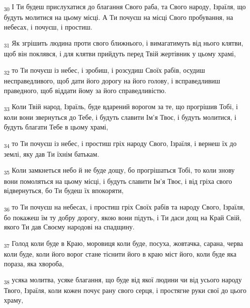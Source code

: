 \begin{tcolorbox}
\textsubscript{30} І Ти будеш прислухатися до благання Свого раба, та Свого народу, Ізраїля, що будуть молитися на цьому місці. А Ти почуєш на місці Свого пробування, на небесах, і почуєш, і простиш.
\end{tcolorbox}
\begin{tcolorbox}
\textsubscript{31} Як згрішить людина проти свого ближнього, і вимагатимуть від нього клятви, щоб він поклявся, і для клятви прийдуть перед Твій жертівник у цьому храмі,
\end{tcolorbox}
\begin{tcolorbox}
\textsubscript{32} то Ти почуєш із небес, і зробиш, і розсудиш Своїх рабів, осудиш несправедливого, щоб дати його дорогу на його голову, і всправедливиш праведного, щоб віддати йому за його справедливістю.
\end{tcolorbox}
\begin{tcolorbox}
\textsubscript{33} Коли Твій народ, Ізраїль, буде вдарений ворогом за те, що прогрішив Тобі, і коли вони звернуться до Тебе, і будуть славити Ім'я Твоє, і будуть молитися, і будуть благати Тебе в цьому храмі,
\end{tcolorbox}
\begin{tcolorbox}
\textsubscript{34} то Ти почуєш із небес, і простиш гріх народу Свого, Ізраїля, і вернеш їх до землі, яку дав Ти їхнім батькам.
\end{tcolorbox}
\begin{tcolorbox}
\textsubscript{35} Коли замкнеться небо й не буде дощу, бо прогрішаться Тобі, то коли знову вони помоляться на цьому місці, і будуть славити Ім'я Твоє, і від гріха свого відвернуться, бо Ти будеш їх впокоряти,
\end{tcolorbox}
\begin{tcolorbox}
\textsubscript{36} то Ти почуєш на небесах, і простиш гріх Своїх рабів та народу Свого, Ізраїля, бо покажеш їм ту добру дорогу, якою вони підуть, і Ти даси дощ на Край Свій, якого Ти дав Своєму народові на спадщину.
\end{tcolorbox}
\begin{tcolorbox}
\textsubscript{37} Голод коли буде в Краю, моровиця коли буде, посуха, жовтачка, сарана, черва коли буде, коли його ворог стане тіснити його в краю міст його, коли буде яка пораза, яка хвороба,
\end{tcolorbox}
\begin{tcolorbox}
\textsubscript{38} усяка молитва, усяке благання, що буде від якої людини чи від усього народу Твого, Ізраїля, коли кожен почує рану свого серця, і простягне руки свої до цього храму,
\end{tcolorbox}
